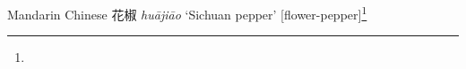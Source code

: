\begin{etymology}\label{ety:huajiao}
Mandarin Chinese {花椒} \textit{huā​jiāo} `Sichuan pepper' [flower-pepper]\footnote{}
\end{etymology}